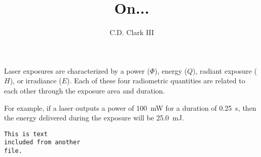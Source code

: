 \documentclass[]{article}
\author{C.D. Clark III}
\title{On...}
\begin{document}
\maketitle

Laser exposures are characterized by a power ($\Phi$), energy ($Q$), radiant exposure ($H$),
or irradiance ($E$). Each of these four radiometric quantities are related to each other
through the exposure area and duration.

For example, if a laser outputs a power of \SI[]{100}{\milli\watt} for a
duration of \SI[]{0.25}{\second}, then the energy delivered during the
exposure will be \SI[]{25.0}{\milli\joule}.
\begin{verbatim}
This is text
included from another
file.

\end{verbatim}
\end{document}
